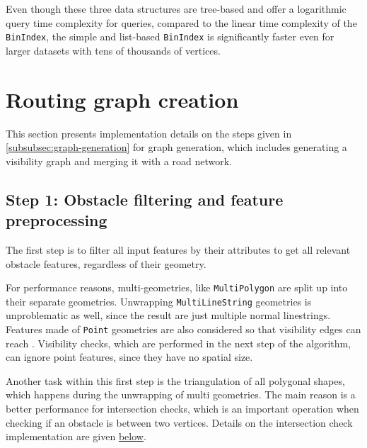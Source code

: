 		Even though these three data structures are tree-based and offer a logarithmic query time complexity for queries, compared to the linear time complexity of the \texttt{BinIndex}, the simple and list-based \texttt{BinIndex} is significantly faster even for larger datasets with tens of thousands of vertices.
		
\section{Routing graph creation}
\label{sec:visibility-graph-creation}
		
	This section presents implementation details on the steps given in \cref{subsubsec:graph-generation} for graph generation, which includes generating a visibility graph and merging it with a road network.

	\subsection{Step 1: Obstacle filtering and feature preprocessing}
	\label{subsec:step-1-preprocessing}
			
		The first step is to filter all input features by their attributes to get all relevant obstacle features, regardless of their geometry.
		
		For performance reasons, multi-geometries, like \texttt{MultiPolygon} are split up into their separate geometries.
		Unwrapping \texttt{MultiLineString} geometries is unproblematic as well, since the result are just multiple normal linestrings.
		Features made of \texttt{Point} geometries are also considered so that visibility edges can reach .
		Visibility checks, which are performed in the next step of the algorithm, can ignore point features, since they have no spatial size.
		
		Another task within this first step is the triangulation of all polygonal shapes, which happens during the unwrapping of multi geometries.
		The main reason is a better performance for intersection checks, which is an important operation when checking if an obstacle is between two vertices.
		Details on the intersection check implementation are given \hyperref[subsubsec:intersection-checks]{below}.
		
